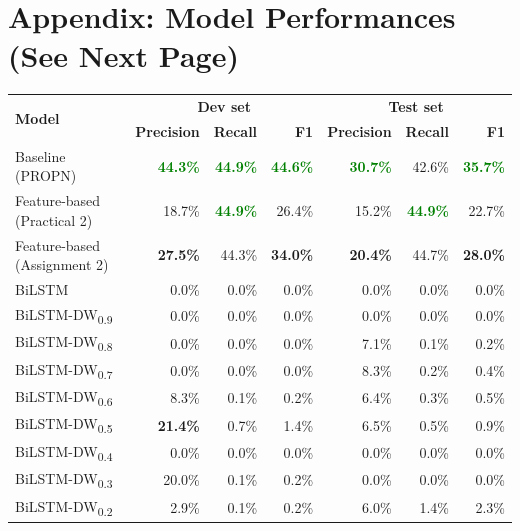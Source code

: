 \documentclass[11pt,a4paper]{article}
\begin{document}
\appendix
\section{Appendix: Model Performances (See Next Page)} \label{appendix}

\begin{table}
    \centering
    \begin{tabular}{lrrrrrr}
        \hline
        \multirow{2}{*}{\textbf{Model}} & \multicolumn{3}{c}{\textbf{Dev set}} & \multicolumn{3}{c}{\textbf{Test set}} \\
        \cline{2-7}
        {} & \textbf{Precision} & \textbf{Recall} & \textbf{F1} & \textbf{Precision} & \textbf{Recall} & \textbf{F1} \\
        \hline
        Baseline (PROPN) & \textcolor{Green}{\textbf{44.3\%}} & \textcolor{Green}{\textbf{44.9\%}} & \textcolor{Green}{\textbf{44.6\%}} & \textcolor{Green}{\textbf{30.7\%}} & 42.6\% & \textcolor{Green}{\textbf{35.7\%}} \\
        \hline
        Feature-based (Practical 2)  & 18.7\% & \textcolor{Green}{\textbf{44.9\%}} & 26.4\% & 15.2\% & \textcolor{Green}{\textbf{44.9\%}} & 22.7\% \\
        Feature-based (Assignment 2) & \textbf{27.5\%} & 44.3\% & \textbf{34.0\%} & \textbf{20.4\%} & 44.7\% & \textbf{28.0\%} \\
        \hline
        BiLSTM & 0.0\% & 0.0\% & 0.0\% & 0.0\% & 0.0\% & 0.0\% \\
        \hline
        BiLSTM-DW\textsubscript{0.9} &  0.0\% &  0.0\% &  0.0\% &  0.0\% &  0.0\% &  0.0\% \\
        BiLSTM-DW\textsubscript{0.8} &  0.0\% &  0.0\% &  0.0\% &  7.1\% &  0.1\% &  0.2\% \\
        BiLSTM-DW\textsubscript{0.7} &  0.0\% &  0.0\% &  0.0\% &  8.3\% &  0.2\% &  0.4\% \\
        BiLSTM-DW\textsubscript{0.6} &  8.3\% &  0.1\% &  0.2\% &  6.4\% &  0.3\% &  0.5\% \\
        BiLSTM-DW\textsubscript{0.5} & \textbf{21.4\%} &  0.7\% &  1.4\% &  6.5\% &  0.5\% &  0.9\% \\
        BiLSTM-DW\textsubscript{0.4} &  0.0\% &  0.0\% &  0.0\% &  0.0\% &  0.0\% &  0.0\% \\
        BiLSTM-DW\textsubscript{0.3} & 20.0\% &  0.1\% &  0.2\% &  0.0\% &  0.0\% &  0.0\% \\
        BiLSTM-DW\textsubscript{0.2} &  2.9\% &  0.1\% &  0.2\% &  6.0\% &  1.4\% &  2.3\% \\

\end{tabular}
\end{table}
\end{document}
